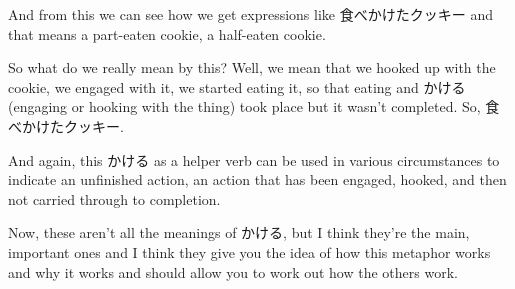 {}

And from this we can see how we get expressions like 食べかけたクッキー and that means a part-eaten cookie, a half-eaten cookie.

{}

So what do we really mean by this? Well, we mean that we hooked up with the cookie, we engaged with it, we started eating it, so that eating and かける (engaging or hooking with the thing) took place but it wasn't completed. So, 食べかけたクッキー.

And again, this かける as a helper verb can be used in various circumstances to indicate an unfinished action, an action that has been engaged, hooked, and then not carried through to completion.

Now, these aren't all the meanings of かける, but I think they're the main, important ones and I think they give you the idea of how this metaphor works and why it works and should allow you to work out how the others work.

{}

\stopsectionlevel

\stopsectionlevel
